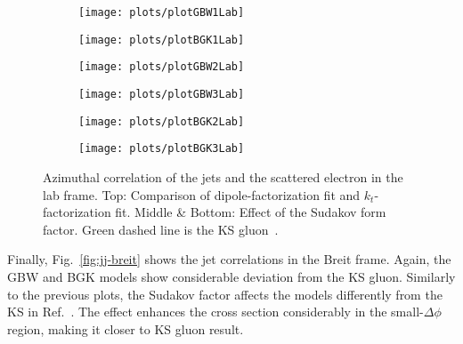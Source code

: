 \documentclass[a4,12pt]{article}
\begin{document}
\begin{figure}[p]
	\begin{subfigure}{0.5\textwidth}
		\texttt{[image: plots/plotGBW1Lab]} 
	\end{subfigure}
	\begin{subfigure}{0.5\textwidth}
		\texttt{[image: plots/plotBGK1Lab]} 
	\end{subfigure}
	\begin{subfigure}{0.5\textwidth}
		\texttt{[image: plots/plotGBW2Lab]}
	\end{subfigure}
	\begin{subfigure}{0.5\textwidth}
		\texttt{[image: plots/plotGBW3Lab]}
	\end{subfigure}
	\begin{subfigure}{0.5\textwidth}
		\texttt{[image: plots/plotBGK2Lab]}
	\end{subfigure}
	\begin{subfigure}{0.5\textwidth}
		\texttt{[image: plots/plotBGK3Lab]}
	\end{subfigure}
\caption{\footnotesize Azimuthal correlation of the jets and the scattered electron in the lab frame. Top: Comparison of dipole-factorization fit and $k_t$-factorization fit. Middle \& Bottom: Effect of the Sudakov form factor.  Green dashed line is the KS gluon~\cite{vanHameren:2021sqc}.}
\label{fig:je-lab}
\end{figure}

Finally, Fig.~\ref{fig:jj-breit} shows the jet correlations in the Breit frame. Again, the GBW and BGK models show considerable deviation from the KS gluon. Similarly to the previous plots, the Sudakov factor affects the models differently from the KS in Ref.~\cite{vanHameren:2021sqc}.
The effect enhances the cross section considerably in the small-$\Delta\phi$ region, making it closer to KS gluon result.
\end{document}
